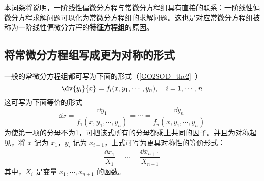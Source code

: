 本词条将说明，一阶线性偏微分方程与常微分方程组具有直接的联系：一阶线性偏微分方程求解问题可以化为常微分方程组的求解问题。这也是对应常微分方程组被称为一阶线性偏微分方程的\textbf{特征方程组}的原因。
\subsection{将常微分方程组写成更为对称的形式}
一般的常微分方程组都可写为下面的形式（\autoref{GO2SOD_the2}~）
\begin{equation}
\dv{y_i}{x}=f_i(x,y_1,\cdots,y_n),\quad i=1,\cdots,n
\end{equation}
这可写为下面等价的形式
\begin{equation}
\dd x=\frac{\dd y_1}{f_1(x,y_1,\cdots,y_n)}=\cdots=\frac{\dd y_n}{f_n(x,y_1,\cdots,y_n)}
\end{equation}
为使第一项的分母不为1，可把该式所有的分母都乘上共同的因子。并且为对称起见，将 $x$ 记为 $x_1$，$y_i$ 记为 $x_{i+1}$，上式可写为更具对称性的等价形式：
\begin{equation}
\frac{\dd x_1}{X_1}=\cdots=\frac{\dd x_{n+1}}{X_{n+1}}
\end{equation}
其中，$X_i$ 是变量 $x_1,\cdots,x_{n+1}$ 的函数。